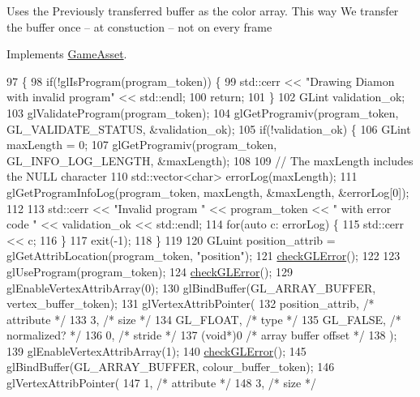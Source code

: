 Uses the Previously transferred buffer as the color array. This way We transfer the buffer once -- at constuction -- not on every frame

Implements \hyperlink{classGameAsset_a961aa51ca0a9961fc584c0b5d5431300}{Game\+Asset}.


\begin{DoxyCode}
97                                            \{
98   \textcolor{keywordflow}{if}(!glIsProgram(program\_token)) \{
99     std::cerr << \textcolor{stringliteral}{"Drawing Diamon with invalid program"} << std::endl;
100     \textcolor{keywordflow}{return};
101   \}
102   GLint validation\_ok;
103   glValidateProgram(program\_token);
104   glGetProgramiv(program\_token, GL\_VALIDATE\_STATUS, &validation\_ok);
105   \textcolor{keywordflow}{if}(!validation\_ok) \{
106     GLint maxLength = 0;
107     glGetProgramiv(program\_token, GL\_INFO\_LOG\_LENGTH, &maxLength);
108 
109     \textcolor{comment}{// The maxLength includes the NULL character}
110     std::vector<char> errorLog(maxLength);
111     glGetProgramInfoLog(program\_token, maxLength, &maxLength, &errorLog[0]);
112 
113     std::cerr << \textcolor{stringliteral}{"Invalid program "} << program\_token << \textcolor{stringliteral}{" with error code "} << validation\_ok << std::endl;
114     \textcolor{keywordflow}{for}(\textcolor{keyword}{auto} c: errorLog) \{
115       std::cerr << c;
116     \}
117     exit(-1);
118   \}
119 
120   GLuint position\_attrib = glGetAttribLocation(program\_token, \textcolor{stringliteral}{"position"});
121   \hyperlink{LeavesAsset_8cc_a75f201b0e53e68726854997957322b8d}{checkGLError}();
122 
123   glUseProgram(program\_token);
124   \hyperlink{LeavesAsset_8cc_a75f201b0e53e68726854997957322b8d}{checkGLError}();
129   glEnableVertexAttribArray(0);
130   glBindBuffer(GL\_ARRAY\_BUFFER, vertex\_buffer\_token);
131   glVertexAttribPointer(
132     position\_attrib,        \textcolor{comment}{/* attribute */}
133     3,        \textcolor{comment}{/* size */}
134     GL\_FLOAT,   \textcolor{comment}{/* type */}
135     GL\_FALSE,   \textcolor{comment}{/* normalized? */}
136     0,        \textcolor{comment}{/* stride */}
137     (\textcolor{keywordtype}{void}*)0    \textcolor{comment}{/* array buffer offset */}
138   );
139   glEnableVertexAttribArray(1);
140   \hyperlink{LeavesAsset_8cc_a75f201b0e53e68726854997957322b8d}{checkGLError}();
145   glBindBuffer(GL\_ARRAY\_BUFFER, colour\_buffer\_token);
146   glVertexAttribPointer(
147     1,        \textcolor{comment}{/* attribute */}
148     3,        \textcolor{comment}{/* size */}

\end{DoxyCode}
